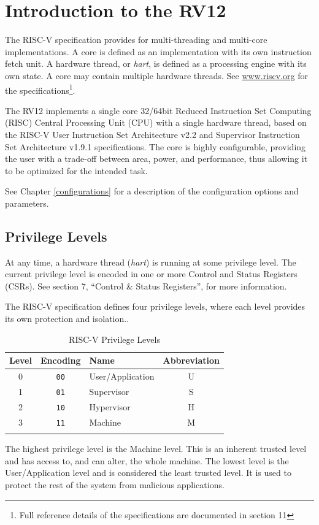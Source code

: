 \chapter{Introduction to the RV12} \label{introduction-to-the-rv12}

The RISC-V specification provides for multi-threading and multi-core implementations. A core is defined as an implementation with its own instruction fetch unit. A hardware thread, or \emph{hart}, is defined as a processing engine with its own state. A core may contain multiple hardware threads. See \href{http://www.riscv.org}{www.riscv.org} for the specifications\footnote{Full reference details of the specifications are documented in section 11}.

The RV12 implements a single core 32/64bit Reduced Instruction Set Computing (RISC) Central Processing Unit (CPU) with a single hardware thread, based on the RISC-V User Instruction Set Architecture v2.2 and Supervisor Instruction Set Architecture v1.9.1 specifications. The core is highly configurable, providing the user with a trade-off between area, power, and performance, thus allowing it to be optimized for the intended task.

See Chapter \ref{configurations} for a description of the configuration options and parameters.

\section{Privilege Levels}\label{privilege-levels}

At any time, a hardware thread (\emph{hart}) is running at some privilege level. The current privilege level is encoded in one or more Control and Status Registers (CSRs). See section 7, ``Control \& Status Registers'', for more information.

The RISC-V specification defines four privilege levels, where each level provides its own protection and isolation..

\begin{longtable}[]{@{}cclc@{}}
\toprule
Level & Encoding & Name & Abbreviation\tabularnewline
\midrule
\endhead
0 & \texttt{00} & User/Application & U\tabularnewline
1 & \texttt{01} & Supervisor & S\tabularnewline
2 & \texttt{10} & Hypervisor & H\tabularnewline
3 & \texttt{11} & Machine & M\tabularnewline
\bottomrule
\caption{RISC-V Privilege Levels}
\label{tab:riscv-priv-levels}
\end{longtable}

The highest privilege level is the Machine level. This is an inherent trusted level and has access to, and can alter, the whole machine. The lowest level is the User/Application level and is considered the least trusted level. It is used to protect the rest of the system from malicious applications.

